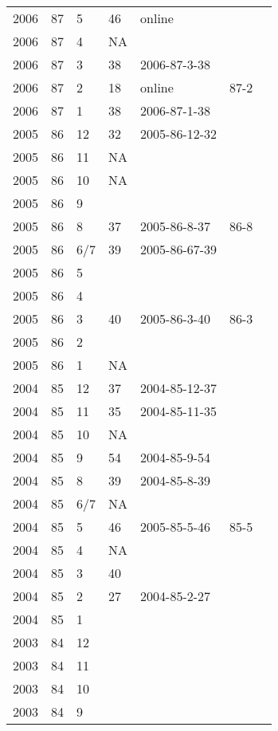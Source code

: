\begin{longtable}{ |l|l|l|l|p{2.7cm}|l|p{2cm}| }
 2006 & 87 &     5 &      46 & online &  & \\
 2006 & 87 &     4 &      NA &  &  & \\
 2006 & 87 &     3 &      38 & 2006-87-3-38 &  & \\
 2006 & 87 &     2 &      18 & online & 87-2  & \\
 2006 & 87 &     1 &      38 & 2006-87-1-38 &  & \\
 2005 & 86 &    12 &      32 & 2005-86-12-32 &  & \\
 2005 & 86 &    11 &      NA &  &  & \\
 2005 & 86 &    10 &      NA &  &  & \\
 2005 & 86 &     9 &         &  &  & \\
 2005 & 86 &     8 &      37 & 2005-86-8-37 & 86-8  & \\
 2005 & 86 &   6/7 &      39 & 2005-86-67-39 &  & \\
 2005 & 86 &     5 &         &  &  & \\
 2005 & 86 &     4 &         & &  & \\
 2005 & 86 &     3 &      40 &  2005-86-3-40 & 86-3 & \\
 2005 & 86 &     2 &       &   &  & \\
 2005 & 86 &     1 &      NA &  &  & \\
 2004 & 85 &    12 &      37 & 2004-85-12-37 &  & \\
 2004 & 85 &    11 &      35 & 2004-85-11-35 &  & \\
 2004 & 85 &    10 &      NA &  &  & \\
 2004 & 85 &     9 &      54 & 2004-85-9-54 &  & \\
 2004 & 85 &     8 &      39 & 2004-85-8-39 &  & \\
 2004 & 85 &   6/7 &      NA &  &  & \\
 2004 & 85 &     5 &      46 & 2005-85-5-46 & 85-5 & \\
 2004 & 85 &     4 &      NA &  &  & \\
 2004 & 85 &     3 &      40 &  &  & \\
 2004 & 85 &     2 &      27 & 2004-85-2-27 &  & \\
 2004 & 85 &     1 &         &  &  & \\
 2003 & 84 &    12 &         &  &  & \\
 2003 & 84 &    11 &         &  &  & \\
 2003 & 84 &    10 &         &  &  & \\
 2003 & 84 &     9 &         &  &  & \\

\end{longtable}
